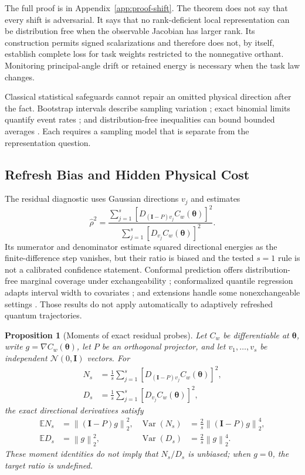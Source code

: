 \documentclass[aps,prx,reprint,superscriptaddress,floatfix]{revtex4-2}
\newtheorem{proposition}[theorem]{Proposition}
\newcommand{\E}{\mathbb{E}}
\newcommand{\I}{\mathbf{I}}
\newcommand{\norm}[1]{\left\lVert #1\right\rVert}
\begin{document}
The full proof is in Appendix~\ref{app:proof-shift}.  The theorem does not say
that every shift is adversarial.  It says that no rank-deficient local
representation can be distribution free when the observable Jacobian has
larger rank.  Its construction permits signed scalarizations and therefore
does not, by itself, establish complete loss for task weights restricted to
the nonnegative orthant.  Monitoring principal-angle drift or retained energy
is necessary when the task law changes.

Classical statistical safeguards cannot repair an omitted physical direction
after the fact.  Bootstrap intervals describe sampling variation
\citep{efron1993bootstrap}; exact binomial limits quantify event rates
\citep{clopper1934fiducial}; and distribution-free inequalities can bound
bounded averages \citep{hoeffding1963probability}.  Each requires a sampling
model that is separate from the representation question.

\subsection{Refresh Bias and Hidden Physical Cost}

The residual diagnostic uses Gaussian directions $v_j$ and estimates
\begin{equation}
 \widehat\rho^2=
 \frac{\sum_{j=1}^{s}
 [D_{(\I-P)v_j}C_w(\bm\theta)]^2}
 {\sum_{j=1}^{s}[D_{v_j}C_w(\bm\theta)]^2}.
 \label{eq:gate}
\end{equation}
Its numerator and denominator estimate squared directional energies as the
finite-difference step vanishes, but their ratio is biased and the tested
$s=1$ rule is not a calibrated confidence statement.  Conformal prediction
offers distribution-free marginal coverage under exchangeability
\citep{vovk2005algorithmic,angelopoulos2021gentle}; conformalized quantile
regression adapts interval width to covariates \citep{romano2019cqr}; and
extensions handle some nonexchangeable settings \citep{barber2022exchangeability}.
Those results do not apply automatically to adaptively refreshed quantum
trajectories.

\begin{proposition}[Moments of exact residual probes]
\label{prop:probe-moments}
Let $C_w$ be differentiable at $\bm\theta$, write
$g=\nabla C_w(\bm\theta)$, let $P$ be an orthogonal projector, and let
$v_1,\ldots,v_s$ be independent $\mathcal N(0,\I)$ vectors.  For
\begin{align*}
 N_s&=\frac{1}{s}\sum_{j=1}^{s}
 [D_{(\I-P)v_j}C_w(\bm\theta)]^2,\\
 D_s&=\frac{1}{s}\sum_{j=1}^{s}
 [D_{v_j}C_w(\bm\theta)]^2,
\end{align*}
the exact directional derivatives satisfy
\begin{align}
 \E N_s&=\norm{(\I-P)g}_2^2,&
 \operatorname{Var}(N_s)&=\frac{2}{s}\norm{(\I-P)g}_2^4,\nonumber\\
 \E D_s&=\norm{g}_2^2,&
 \operatorname{Var}(D_s)&=\frac{2}{s}\norm{g}_2^4.
 \label{eq:probe-moments}
\end{align}
These moment identities do not imply that $N_s/D_s$ is unbiased; when
$g=0$, the target ratio is undefined.
\end{proposition}
\end{document}
